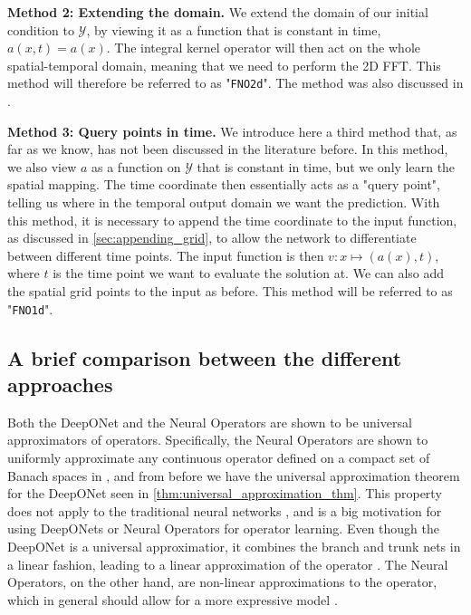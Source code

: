\textbf{Method 2: Extending the domain.} We extend the domain of our initial condition to \(\mathcal{Y}\), by viewing it as a function that is constant in time, \(a(x,t)=a(x)\).
The integral kernel operator will then act on the whole spatial-temporal domain, meaning that we need to perform the 2D FFT.
This method will therefore be referred to as "\texttt{FNO2d}". The method was also discussed in .

\textbf{Method 3: Query points in time.} We introduce here a third method that, as far as we know, has not been discussed in the literature before. In this method, we also view \(a\) as a function on 
\(\mathcal{Y}\) that is constant in time, but we only learn the spatial mapping. 
The time coordinate then essentially acts as a "query point", telling us where in the temporal output domain we want the prediction.
With this method, it is necessary to append the time coordinate to the input function, as discussed in \cref{sec:appending_grid}, to allow the network to differentiate between different time points.
The input function is then \(v : x \mapsto (a(x), t)\), where \(t\) is the time point we want to evaluate the solution at.
We can also add the spatial grid points to the input as before.
This method will be referred to as "\texttt{FNO1d}".

\subsection{A brief comparison between the different approaches}

Both the DeepONet and the Neural Operators are shown to be universal approximators of operators. 
Specifically, the Neural Operators are shown to uniformly approximate any continuous operator defined on a compact set of Banach spaces in 
, and from before we have the universal approximation theorem for the DeepONet seen in \cref{thm:universal_approximation_thm}.
This property does not apply to the traditional neural networks \cite{kovachkiNeuralOperatorLearning2024}, and is a big motivation for using DeepONets or Neural Operators for operator learning.
Even though the DeepONet is a universal approximatior, it combines the branch and trunk nets in a linear fashion, leading to a linear approximation of the operator . The Neural Operators, on the other hand, are non-linear approximations to the operator, which in general should allow for a more expressive model \cite{kovachkiNeuralOperatorLearning2024}.

